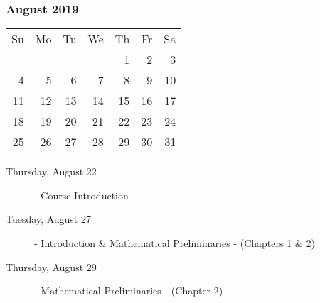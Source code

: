 \subsubsection*{August 2019}
\begin{tabular}{rrrrrrr}
Su & Mo & Tu & We & Th & Fr & Sa\\
   &    &    &    &  1 &  2 &  3\\
 4 &  5 &  6 &  7 &  8 &  9 & 10\\
11 & 12 & 13 & 14 & 15 & 16 & 17\\
18 & 19 & 20 & 21 & 22 & 23 & 24\\
25 & 26 & 27 & 28 & 29 & 30 & 31\\
\end{tabular}
\begin{description}
\item[Thursday, August 22]
  - Course Introduction

\item[Tuesday, August 27]
  - Introduction \& Mathematical Preliminaries
  \newline - (Chapters 1 \& 2)
\item[Thursday, August 29]
  - Mathematical Preliminaries
  \newline - (Chapter 2)
\end{description}
\hrulefill

